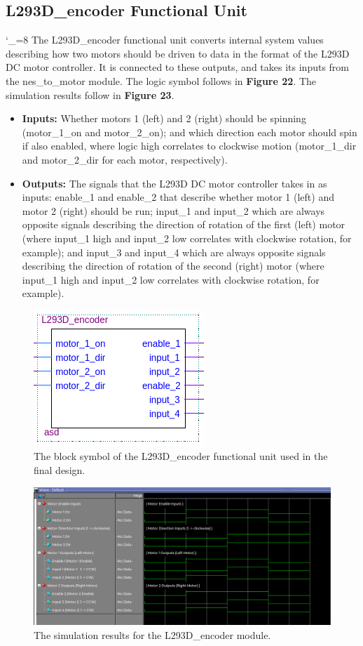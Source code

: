 \documentclass[a4paper]{article}
\begin{document}
\subsection{L293D\_encoder Functional Unit}
\catcode`_=8
The L293D\_encoder functional unit converts internal system values describing how two motors should be driven to data in the format of the L293D DC motor controller. It is connected to these outputs, and takes its inputs from the nes\_to\_motor module. The logic symbol follows in \textbf{Figure 22}.  The simulation results follow in \textbf{Figure 23}.
\begin{itemize}
\item \textbf{Inputs:  } Whether motors 1 (left) and 2 (right) should be spinning (motor\_1\_on and motor\_2\_on); and which direction each motor should spin if also enabled, where logic high correlates to clockwise motion (motor\_1\_dir and motor\_2\_dir for each motor, respectively).
\item \textbf{Outputs: } The signals that the L293D DC motor controller takes in as inputs: enable\_1 and enable\_2 that describe whether motor 1 (left) and motor 2 (right) should be run; input\_1 and input\_2 which are always opposite signals describing the direction of rotation of the first (left) motor (where input\_1 high and input\_2 low correlates with clockwise rotation, for example); and input\_3 and input\_4 which are always opposite signals describing the direction of rotation of the second (right) motor (where input\_1 high and input\_2 low correlates with clockwise rotation, for example).
\end{itemize}
\begin{figure}[h]
\centering
\includegraphics[width=.48\textwidth]{functional_units/L293D_encoder/L293D_encoder_symbol.png}
\caption{The block symbol of the L293D\_encoder functional unit used in the final design.}
\end{figure}
\begin{figure}[h]
\centering
\includegraphics[width=.98\textwidth]{functional_units/L293D_encoder/L293D_encoder_sim.png}
\caption{The simulation results for the L293D\_encoder module.}
\end{figure}
\end{document}
